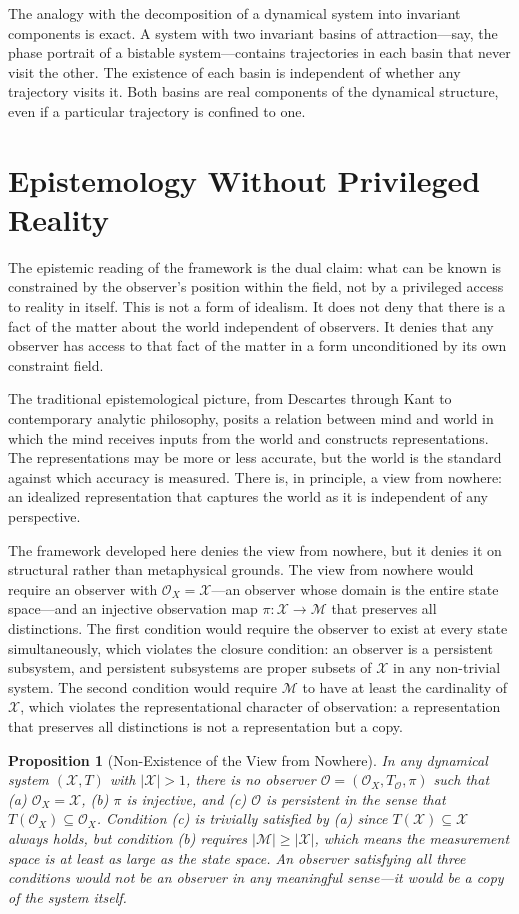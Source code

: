 \documentclass[12pt, a4paper, oneside]{article}
\theoremstyle{plain}
\newtheorem{proposition}[theorem]{Proposition}
\theoremstyle{definition}
\theoremstyle{remark}
\newcommand{\X}{\mathcal{X}}
\newcommand{\M}{\mathcal{M}}
\newcommand{\Obs}{\mathcal{O}}
\newcommand{\T}{T}
\newcommand{\proj}{\pi}
\begin{document}
The analogy with the decomposition of a dynamical system into invariant components is exact. A system with two invariant basins of attraction---say, the phase portrait of a bistable system---contains trajectories in each basin that never visit the other. The existence of each basin is independent of whether any trajectory visits it. Both basins are real components of the dynamical structure, even if a particular trajectory is confined to one.

\section{Epistemology Without Privileged Reality}

The epistemic reading of the framework is the dual claim: what can be known is constrained by the observer's position within the field, not by a privileged access to reality in itself. This is not a form of idealism. It does not deny that there is a fact of the matter about the world independent of observers. It denies that any observer has access to that fact of the matter in a form unconditioned by its own constraint field.

The traditional epistemological picture, from Descartes through Kant to contemporary analytic philosophy, posits a relation between mind and world in which the mind receives inputs from the world and constructs representations. The representations may be more or less accurate, but the world is the standard against which accuracy is measured. There is, in principle, a view from nowhere: an idealized representation that captures the world as it is independent of any perspective.

The framework developed here denies the view from nowhere, but it denies it on structural rather than metaphysical grounds. The view from nowhere would require an observer with $\Obs_X = \X$---an observer whose domain is the entire state space---and an injective observation map $\proj : \X \to \M$ that preserves all distinctions. The first condition would require the observer to exist at every state simultaneously, which violates the closure condition: an observer is a persistent subsystem, and persistent subsystems are proper subsets of $\X$ in any non-trivial system. The second condition would require $\M$ to have at least the cardinality of $\X$, which violates the representational character of observation: a representation that preserves all distinctions is not a representation but a copy.

\begin{proposition}[Non-Existence of the View from Nowhere]
\label{prop:no-vnw}
In any dynamical system $(\X, \T)$ with $|\X| > 1$, there is no observer $\Obs = (\Obs_X, \T_\Obs, \proj)$ such that (a) $\Obs_X = \X$, (b) $\proj$ is injective, and (c) $\Obs$ is persistent in the sense that $\T(\Obs_X) \subseteq \Obs_X$. Condition (c) is trivially satisfied by (a) since $\T(\X) \subseteq \X$ always holds, but condition (b) requires $|\M| \geq |\X|$, which means the measurement space is at least as large as the state space. An observer satisfying all three conditions would not be an observer in any meaningful sense---it would be a copy of the system itself.
\end{proposition}
\end{document}
